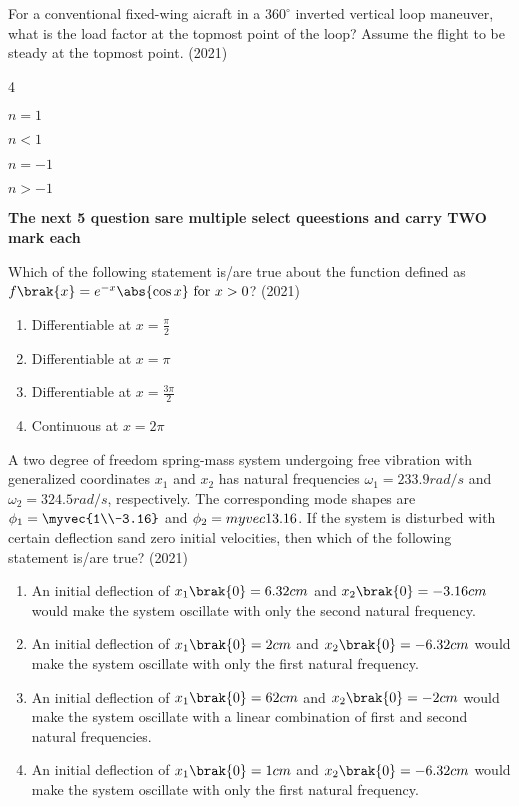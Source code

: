 	\item For a conventional fixed-wing aicraft in a $360^\circ$ inverted vertical loop maneuver, what is the load factor  at the topmost point of the loop? Assume the flight to be steady at the topmost point.
	\hfill{(2021)}
               \begin{enumerate}
	       \end{enumerate}	
\textbf{The next 5 question sare multiple select queestions and carry TWO mark each}
       \item Which of the following statement is/are true about the function defined as $f\brak{x} = e^{-x}\abs{\cos x} \text{ for } x>0 $?
       \hfill{(2021)}
             \begin{enumerate}
                 \item Differentiable at $x=\frac{\pi}{2}$
                 \item Differentiable at $x=\pi$
                 \item Differentiable at $x=\frac{3\pi}{2}$
                 \item Continuous at $x=2\pi$
             \end{enumerate}
	\item  A two degree of freedom spring-mass system undergoing free vibration with generalized coordinates $x_1$ and $x_2$ has natural frequencies $\omega_1=233.9rad/s$ and $\omega_2=324.5rad/s$, respectively. The corresponding mode shapes are $\phi_1=\myvec{1\\-3.16}$ and $\phi_2=myvec{1\\3.16}$. If the system is disturbed with certain deflection sand zero initial velocities, then which of the following statement is/are true?
	\hfill{(2021)}
		\begin{enumerate}
			\item An initial deflection of $ x_1\brak{0}=6.32cm$ and $x_2\brak{0}=-3.16cm$ would make the system oscillate with only the second natural frequency. 
			\item An initial deflection of $ x_1\brak{0}=2cm$ and $x_2\brak{0}=-6.32cm$ would make the system oscillate with only the first natural frequency. 
			\item  An initial deflection of $ x_1\brak{0}=62cm$ and $x_2\brak{0}=-2cm$ would make the system oscillate with a linear combination of first and second natural frequencies. 
	        \item  An initial deflection of $ x_1\brak{0}=1cm$ and $x_2\brak{0}=-6.32cm$ would make the system oscillate with only the first natural frequency. 
        	\end{enumerate}

